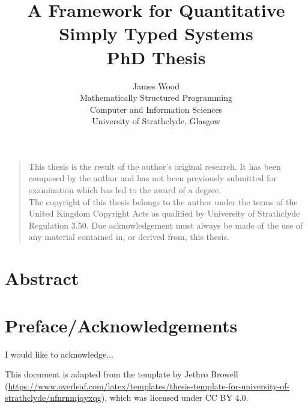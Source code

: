 \documentclass[a4paper,oneside,11pt]{book}
\title{A Framework for Quantitative Simply Typed Systems \\ PhD Thesis}
\author{James Wood
\\ \small Mathematically Structured Programming\\[-0.8ex]
\small Computer and Information Sciences\\[-0.8ex]
\small University of Strathclyde, Glasgow\\
}
\theoremstyle{definition}
\begin{document}
\maketitle


\frontmatter

\vspace*{\fill}
\noindent
\begin{quote}
  \centering
  This thesis is the result of the author's original research. It has been composed by the author and has not been previously submitted for examination which has led to the award of a degree. \\[5pt]
  The copyright of this thesis belongs to the author under the terms of the United Kingdom Copyright Acts as qualified by University of Strathclyde Regulation 3.50. Due acknowledgement must always be made of the use of any material contained in, or derived from, this thesis. \\[5pt]
\end{quote}
\vspace*{\fill}



\chapter{Abstract}



\tableofcontents

\listoffigures

\listoftables



\chapter{Preface/Acknowledgements}
I would like to acknowledge...

This document is adapted from the template by Jethro Browell
(\url{https://www.overleaf.com/latex/templates/thesis-template-for-university-of-strathclyde/nfnrnmjqyxqg}),
which was licensed under CC BY 4.0.



\mainmatter
\end{document}
